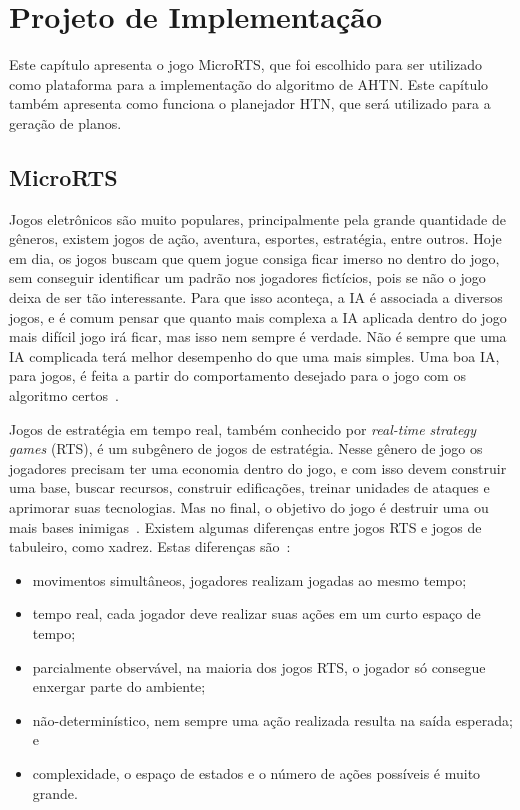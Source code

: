 
\chapter{\label{chap:proj}Projeto de Implementação}

Este capítulo apresenta o jogo MicroRTS, que foi escolhido para ser utilizado como plataforma para a implementação do algoritmo de AHTN. Este capítulo também apresenta como funciona o planejador HTN, que será utilizado para a geração de planos.

\section{MicroRTS}  \label{sec:microrts}

Jogos eletrônicos são muito populares, principalmente pela grande quantidade de gêneros, existem jogos de ação, aventura, esportes, estratégia, entre outros. Hoje em dia, os jogos buscam que quem jogue consiga ficar imerso no dentro do jogo, sem conseguir identificar um padrão nos jogadores fictícios, pois se não o jogo deixa de ser tão interessante. Para que isso aconteça, a IA é associada a diversos jogos, e é comum pensar que quanto mais complexa a IA aplicada dentro do jogo mais difícil jogo irá ficar, mas isso nem sempre é verdade. Não é sempre que uma IA complicada terá melhor desempenho do que uma mais simples. Uma boa IA, para jogos, é feita a partir do comportamento desejado para o jogo com os algoritmo certos~\cite{millington2009artificial}.

Jogos de estratégia em tempo real, também conhecido por \textit{real-time strategy games} (RTS), é um subgênero de jogos de estratégia. Nesse gênero de jogo os jogadores precisam ter uma economia dentro do jogo, e com isso devem construir uma base, buscar recursos, construir edificações, treinar unidades de ataques e aprimorar suas tecnologias. Mas no final, o objetivo do jogo é destruir uma ou mais bases inimigas~\cite{ontanon2013survey, buro2012real}. Existem algumas diferenças entre jogos RTS e jogos de tabuleiro, como xadrez. Estas diferenças são~\cite{ontanon2013survey}:

\begin{itemize}
	\item movimentos simultâneos, jogadores realizam jogadas ao mesmo tempo;
	\item tempo real, cada jogador deve realizar suas ações em um curto espaço de tempo;
	\item parcialmente observável, na maioria dos jogos RTS, o jogador só consegue enxergar parte do ambiente;
	\item não-determinístico, nem sempre uma ação realizada resulta na saída esperada; e
	\item complexidade, o espaço de estados e o número de ações possíveis é muito grande.
\end{itemize} 

